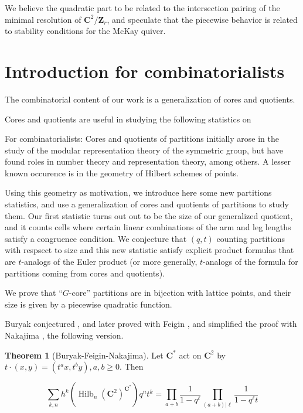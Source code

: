 \documentclass{amsart}[12pt]
\theoremstyle{definition}
\newtheorem{theorem}[dummy]{Theorem}
\newcommand{\Z}{\mathbf{Z}}
\newcommand{\C}{\mathbf{C}}
\DeclareMathOperator{\Hilb}{Hilb}
\begin{document}
We believe the quadratic part to be related to the intersection pairing of the minimal resolution of $\C^2/\Z_r$, and speculate that the piecewise behavior is related to stability conditions for the McKay quiver.




\section{Introduction for combinatorialists}

The combinatorial content of our work is a generalization of cores and quotients.  

Cores and quotients are useful in studying the following statistics on 



For combinatorialists: Cores and quotients of partitions initially arose in the study of the modular representation theory of the symmetric group, but have found roles in number theory and representation theory, among others.  A lesser known occurence is in the geometry of Hilbert schemes of points.  

Using this geometry as motivation, we introduce here some new partitions statistics, and use a generalization of cores and quotients of partitions to study them.  Our first statistic turns out out to be the size of our generalized quotient, and it counts cells where certain linear combinations of the arm and leg lengths satisfy a congruence condition.  We conjecture that $(q,t)$ counting partitions with respsect to size and this new statistic satisfy explicit product formulas that are $t$-analogs of the Euler product (or more generally, $t$-analogs of the formula for partitions coming from cores and quotients).  

We prove that ``$G$-core'' partitions are in bijection with lattice points, and their size is given by a piecewise quadratic function.  




Buryak conjectured \cite{Buryak}, and later proved with Feigin \cite{BF}, and simplified the proof with Nakajima \cite{BFN}, the following version. 

\begin{theorem}[Buryak-Feigin-Nakajima] \label{thm:BFN}
Let $\C^*$ act on $\C^2$ by $t\cdot (x,y)=(t^ax, t^by), a,b\geq 0$.  Then

$$\sum_{k,n} h^k(\Hilb_n(\C^2)^{\C^*})q^nt^k=\prod_{a+b } \frac{1}{1-q^\ell}\prod_{(a+b)|\ell} \frac{1}{1-q^\ell t}$$
\end{theorem}
\end{document}
